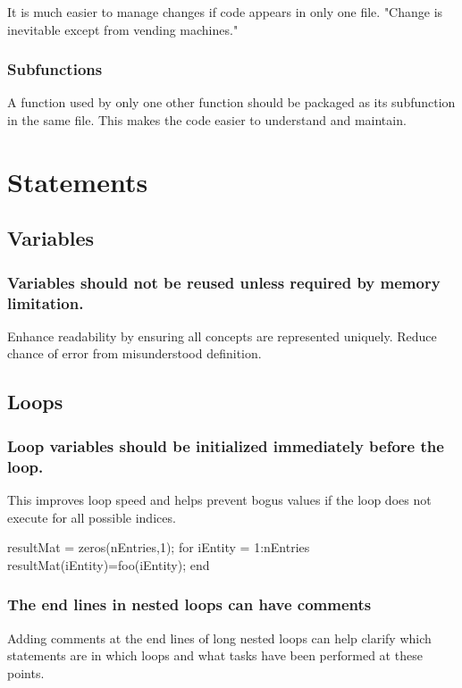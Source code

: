 \documentclass[titlepage,a4paper,12pt]{article}
\begin{document}
It is much easier to manage changes if code appears in only one
file. "Change is inevitable except from vending machines."

\subsubsection{Subfunctions}

A function used by only one other function should be packaged as its
subfunction in the same file. This makes the code easier to
understand and maintain.

\section{Statements}

\subsection{Variables}

\subsubsection{Variables should not be reused
unless required by memory limitation.}

 Enhance readability by
ensuring all concepts are represented uniquely. Reduce chance of
error from misunderstood definition.


\subsection{Loops}

 \subsubsection{Loop variables
should be initialized immediately before the loop.}
 This improves
loop speed and helps prevent bogus values if the loop does not
execute for all possible indices.
\begin{verbmcode}
resultMat = zeros(nEntries,1);
for iEntity = 1:nEntries
    resultMat(iEntity)=foo(iEntity);
end
\end{verbmcode}


\subsubsection{The end lines
in nested loops can have comments}

 Adding comments at the end lines
of long nested loops can help clarify which statements are in which
loops and what tasks have been performed at these points.
\end{document}
